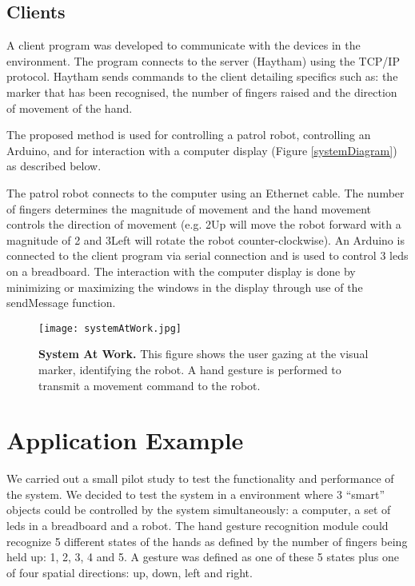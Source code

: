 \documentclass[jou,a4paper,notxfonts]{apa}
\begin{document}
\subsection{Clients}
A client program was developed to communicate with the devices in the environment. The program connects to the server (Haytham) using the TCP/IP protocol. Haytham sends commands to the client detailing specifics such as: the marker that has been recognised, the number of fingers raised and the direction of movement of the hand. 

The proposed method is used for controlling a patrol robot, controlling an Arduino, and for interaction with a computer display (Figure \ref{systemDiagram}) as described below.

The patrol robot connects to the computer using an Ethernet cable. The number of fingers determines the magnitude of movement and the hand movement controls the direction of movement (e.g. 2Up will move the robot forward with a magnitude of 2 and 3Left will rotate the robot counter-clockwise). An Arduino is connected to the client program via serial connection and is used to control 3 leds on a breadboard. The interaction with the computer display is done by minimizing or maximizing the windows in the display through use of the sendMessage function.

\begin{figure}[tp]
 \texttt{[image: systemAtWork.jpg]}
 \caption{\textbf{System At Work.} This figure shows the user gazing at the visual marker, identifying the robot. A hand gesture is performed to transmit a movement command to the robot.}
 \label{systemAtWork}
\end{figure}

\section{Application Example}
We carried out a small pilot study to test the functionality and performance of the system. We decided to test the
system in a environment where 3 ``smart'' objects could be controlled by the system simultaneously: a computer, a set of
leds in a breadboard and a robot. The hand gesture recognition module could recognize 5 different states of the hands
as defined by the number of fingers being held up: 1, 2, 3, 4 and 5. A gesture was defined as one of these 5 states plus
one of four spatial directions: up, down, left and right.
\end{document}
